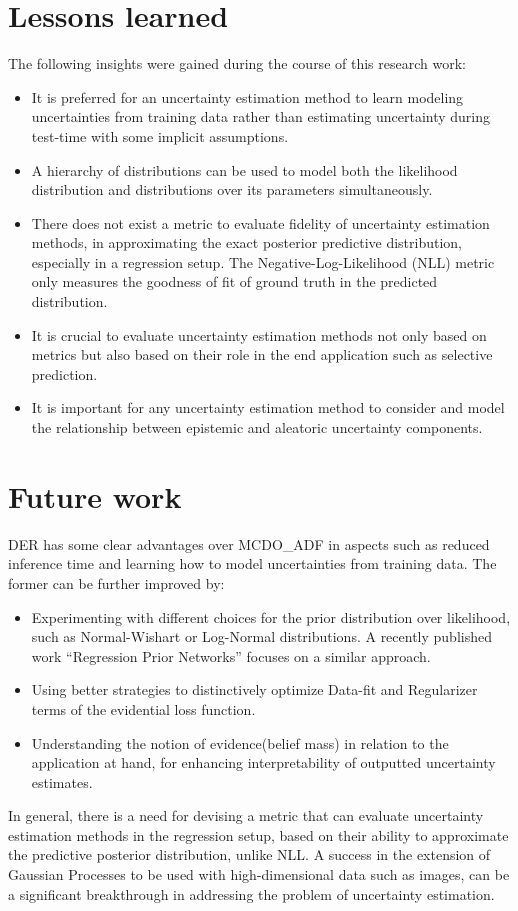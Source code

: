     \section{Lessons learned}
    The following insights were gained during the course of this research work:
    \begin{itemize}
    	\item It is preferred for an uncertainty estimation method to learn modeling uncertainties from training data rather than estimating uncertainty during test-time with some implicit assumptions.
    	\item A hierarchy of distributions can be used to model both the likelihood distribution and distributions over its parameters simultaneously.
    	\item There does not exist a metric  to evaluate fidelity of uncertainty estimation methods, in approximating the exact posterior predictive  distribution, especially in a regression setup. The Negative-Log-Likelihood (NLL) metric only measures the goodness of fit of ground truth in the predicted distribution.
    	\item It is crucial to evaluate uncertainty estimation methods not only based on metrics but also based on their role in the end application such as selective prediction. 
    	\item It is important for any uncertainty estimation method to consider and model the relationship between epistemic and aleatoric uncertainty components.    	
    \end{itemize}

    \section{Future work}
    DER has some clear advantages over MCDO\_ADF in aspects such as reduced inference time and learning how to model uncertainties from training data. The former can be further improved by:
    \begin{itemize}
    	\item Experimenting with different choices for the prior distribution over likelihood, such as Normal-Wishart or Log-Normal distributions. A recently published work \enquote{Regression Prior Networks}\cite{malinin2020regression} focuses on a similar approach.
    	\item Using better strategies to distinctively optimize Data-fit and Regularizer terms of the evidential loss function.
    	\item Understanding the notion of evidence(belief mass) in relation to the application at hand, for enhancing interpretability of outputted uncertainty estimates.
    \end{itemize}

    In general, there is a need for devising a metric that can evaluate uncertainty estimation methods in the regression setup, based on their ability to approximate the predictive posterior distribution, unlike NLL. A success in the extension of Gaussian Processes to be used with high-dimensional data such as images, can be a significant breakthrough in addressing the problem of uncertainty estimation.
    	 
    

